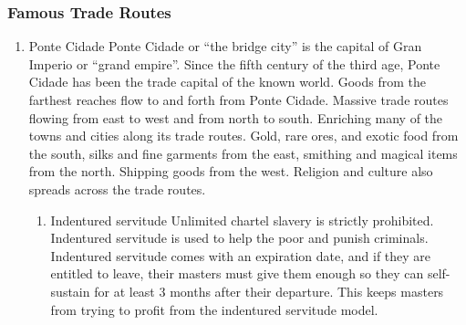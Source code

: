 \documentclass[11pt]{article}
\begin{document}
\subsubsection{Famous Trade Routes}
\label{sec:org2a0a49c}
\begin{enumerate}
\item Ponte Cidade
\label{sec:orgd8a2740}
Ponte Cidade or ``the bridge city'' is the capital of Gran Imperio or ``grand empire''. Since the fifth century of the third age, Ponte Cidade has been the trade capital of the known world. Goods from the farthest reaches flow to and forth from Ponte Cidade. Massive trade routes flowing from east to west and from north to south. Enriching many of the towns and cities along its trade routes. Gold, rare ores, and exotic food from the south, silks and fine garments from the east, smithing and magical items from the north. Shipping goods from the west. Religion and culture also spreads across the trade routes.
\begin{enumerate}
\item Indentured servitude
\label{sec:orgb4a1cdc}
Unlimited chartel slavery is strictly prohibited. Indentured servitude is used to help the poor and punish criminals. Indentured servitude comes with an expiration date, and if they are entitled to leave,  their masters must give them enough so they can self-sustain for at least 3 months after their departure. This keeps masters from trying to profit from the indentured servitude model.
\end{enumerate}
\end{enumerate}
\end{document}
